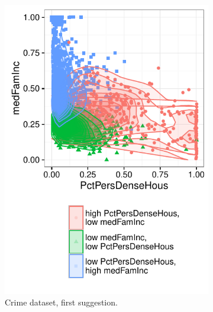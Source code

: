 \begin{figure}
\begin{subfigure}[b]{0.3\textwidth}
        \includegraphics[width=\textwidth]{Experiments/Case2Validation1}
        \caption{Crime dataset, first suggestion.}
        \label{fig:validation2}
    \end{subfigure}
    ~
    \begin{subfigure}[b]{0.3\textwidth}

\end{subfigure}
\end{figure}
